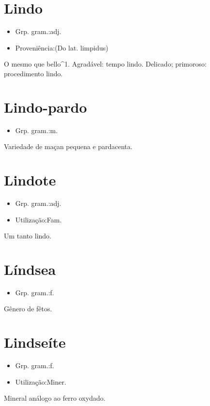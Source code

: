 \section{Lindo}
\begin{itemize}
\item {Grp. gram.:adj.}
\end{itemize}
\begin{itemize}
\item {Proveniência:(Do lat. \textunderscore limpidus\textunderscore )}
\end{itemize}
O mesmo que \textunderscore bello\textunderscore ^1.
Agradável: \textunderscore tempo lindo\textunderscore .
Delicado; primoroso: \textunderscore procedimento lindo\textunderscore .
\section{Lindo-pardo}
\begin{itemize}
\item {Grp. gram.:m.}
\end{itemize}
Variedade de maçan pequena e pardacenta.
\section{Lindote}
\begin{itemize}
\item {Grp. gram.:adj.}
\end{itemize}
\begin{itemize}
\item {Utilização:Fam.}
\end{itemize}
Um tanto lindo.
\section{Líndsea}
\begin{itemize}
\item {Grp. gram.:f.}
\end{itemize}
Gênero de fêtos.
\section{Lindseíte}
\begin{itemize}
\item {Grp. gram.:f.}
\end{itemize}
\begin{itemize}
\item {Utilização:Miner.}
\end{itemize}
Mineral análogo ao ferro oxydado.
